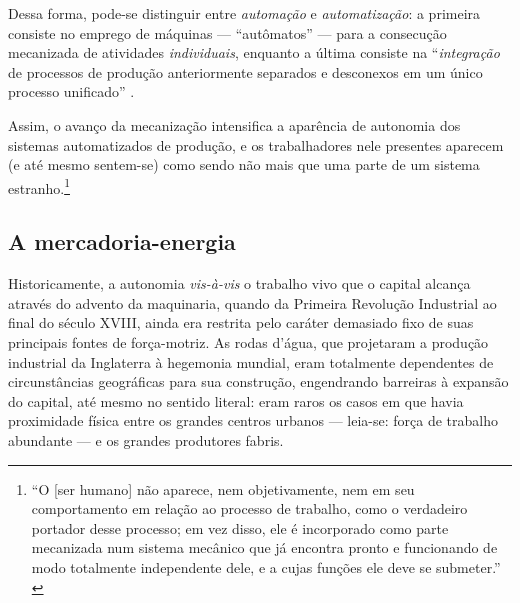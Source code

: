 Dessa forma, pode-se distinguir entre \textit{automação} e \textit{automatização}: a primeira consiste no emprego de máquinas --- ``autômatos'' --- para a consecução mecanizada de atividades \textit{individuais}, enquanto a última consiste na ``\textit{integração} de processos de produção anteriormente separados e desconexos em um único processo unificado'' \parencite[p. 6]{Pollock1957}. 

Assim, o avanço da mecanização intensifica a aparência de autonomia dos sistemas automatizados de produção, e os trabalhadores nele presentes aparecem (e até mesmo sentem-se) como sendo não mais que uma parte de um sistema estranho.\footnote{``O [ser humano] não aparece, nem objetivamente, nem em seu comportamento em relação ao processo de trabalho, como o verdadeiro portador desse processo; em vez disso, ele é incorporado como parte mecanizada num sistema mecânico que já encontra pronto e funcionando de modo totalmente independente dele, e a cujas funções ele deve se submeter.'' \parencite[p. 203-4]{Lukacs2003a}} 

\subsection{A mercadoria-energia}

Historicamente, a autonomia \textit{vis-à-vis} o trabalho vivo que o capital alcança através do advento da maquinaria, quando da Primeira Revolução Industrial ao final do século XVIII, ainda era restrita pelo caráter demasiado fixo de suas principais fontes de força-motriz. As rodas d'água, que projetaram a produção industrial da Inglaterra à hegemonia mundial, eram totalmente dependentes de circunstâncias geográficas para sua construção, engendrando barreiras à expansão do capital, até mesmo no sentido literal: eram raros os casos em que havia proximidade física entre os grandes centros urbanos --- leia-se: força de trabalho abundante --- e os grandes produtores fabris.

